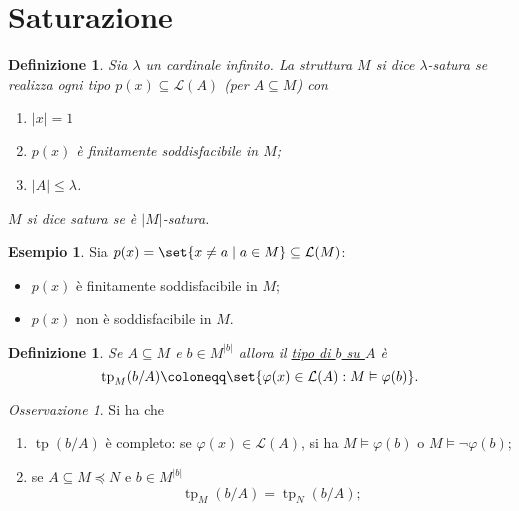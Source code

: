 \documentclass[10pt]{article}
\newcommand{\card}[1]{\left\vert #1 \right\vert}
\newcommand{\1}{\mathds{1}}
\theoremstyle{definition}%
\newtheorem{esempio}[thm]{Esempio}
\theoremstyle{plain}
\newtheorem{definizione}[thm]{Definizione}
\theoremstyle{remark}
\newtheorem*{oss}{Osservazione}
\begin{document}
\section{Saturazione}
\label{sec:orgd14c41a}

\begin{definizione}
Sia \(\lambda\) un cardinale infinito. La struttura \(M\) si dice \(\lambda\)-satura se realizza ogni tipo \(p(x) \subseteq \mathcal{L}(A)\) (per \(A \subseteq M\)) con
\begin{enumerate}
\item \(\card{x}=1\)
\item \(p(x)\) è finitamente soddisfacibile in \(M\);
\item \(\card{A}\le\lambda\).
\end{enumerate}

\(M\) si dice satura se è \(\card{M}\)-satura.
\end{definizione}

\begin{esempio}
Sia \(p(x) = \set{x\neq a\mid  a \in M} \subseteq \mathcal{L}(M)\):
\begin{itemize}
\item \(p(x)\) è finitamente soddisfacibile in \(M\);
\item \(p(x)\) non è soddisfacibile in \(M\).
\end{itemize}
\end{esempio}

\begin{definizione}
Se \(A \subseteq M\) e \(b \in M^{|b|}\) allora il \uline{tipo di \(b\) su \(A\)} è
\begin{equation*}
\operatorname{tp}_{M}(b/A) \coloneqq\set{\varphi(x) \in \mathcal{L}(A): M\vDash \varphi(b)}.
\end{equation*}
\end{definizione}

\begin{oss}
Si ha che
\begin{enumerate}
\item \(\operatorname{tp}(b/A)\) è completo: se \(\varphi(x) \in \mathcal{L}(A)\), si ha \(M\vDash\varphi(b)\) o \(M\vDash \lnot\varphi(b)\);
\item se \(A \subseteq M\preceq N\) e \(b \in M^{|b|}\)
\begin{equation*}
 \operatorname{tp}_{M}(b/A) = \operatorname{tp}_{N}(b/A);
\end{equation*}
\end{enumerate}
\end{oss}
\end{document}
